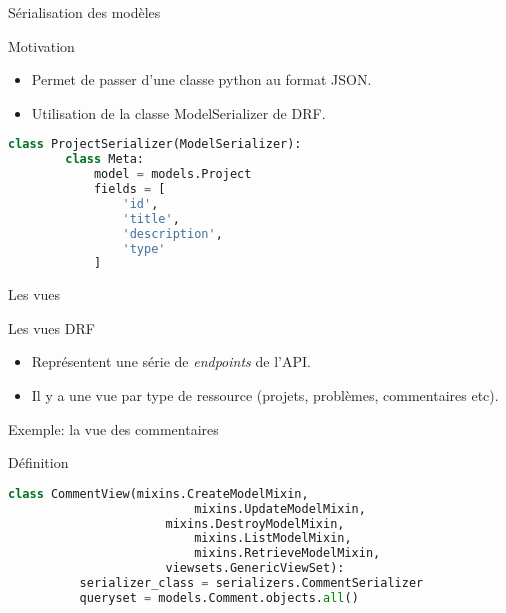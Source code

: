 \begin{frame}[fragile]{Sérialisation des modèles}
  \begin{block}{Motivation}
    \begin{itemize}
    \item Permet de passer d'une classe python au format JSON.
    \item Utilisation de la classe \textsf{ModelSerializer} de DRF.
    \end{itemize}        
  \end{block}

  \begin{center}
    \tiny
    \begin{lstlisting}[language=Python]
      class ProjectSerializer(ModelSerializer):
        class Meta:
            model = models.Project
            fields = [
                'id',
                'title',
                'description',
                'type'
            ]
    \end{lstlisting}
  \end{center}
\end{frame}

\begin{frame}[fragile]{Les vues}
  \begin{block}{Les vues DRF}
    \begin{itemize}
    \item Représentent une série de \textit{endpoints} de l'API.
    \item Il y a une vue par type de ressource (projets, problèmes, commentaires etc).
    \end{itemize}
  \end{block}
\end{frame}

\begin{frame}[fragile]{Exemple: la vue des commentaires}
  \begin{block}{Définition}
    \begin{center}    
      \tiny
      \begin{lstlisting}[language=python]
        class CommentView(mixins.CreateModelMixin,
                          mixins.UpdateModelMixin,
	                  mixins.DestroyModelMixin,
                          mixins.ListModelMixin,
                          mixins.RetrieveModelMixin,
	                  viewsets.GenericViewSet):
          serializer_class = serializers.CommentSerializer
          queryset = models.Comment.objects.all()
      \end{lstlisting}
    \end{center}
  \end{block}
\end{frame}


